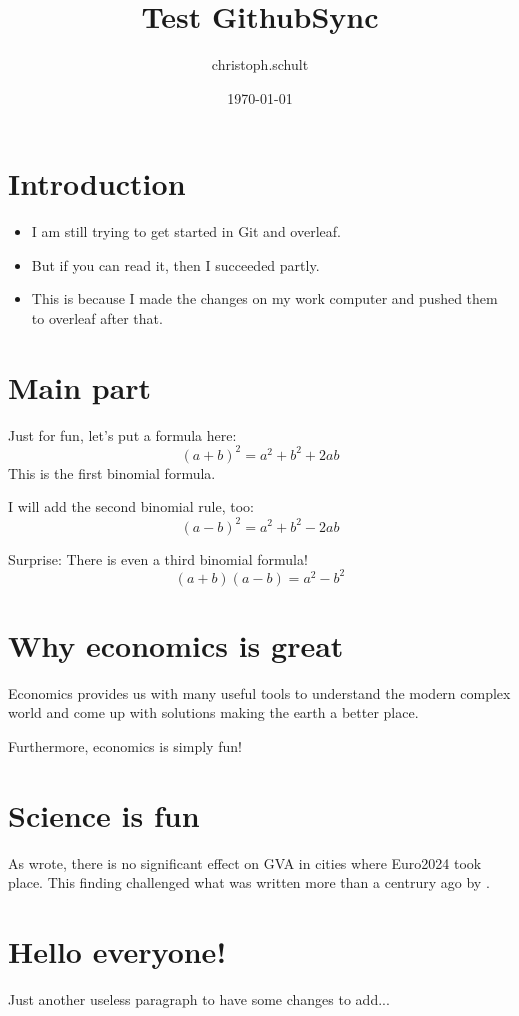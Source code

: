 \documentclass{article}
\title{Test GithubSync}
\author{christoph.schult }
\date{\today}
\begin{document}
\maketitle

\section{Introduction}

\begin{itemize} 
    \item I am still trying to get started in Git and overleaf.
    \item But if you can read it, then I succeeded partly.
    \item This is because I made the changes on my work computer and pushed them to overleaf after that.
\end{itemize}

\section{Main part}
Just for fun, let's put a formula here: 
$$ (a + b)^2 = a^2 + b^2 + 2ab $$
This is the first binomial formula. 

I will add the second binomial rule, too:
$$ (a - b)^2 = a^2 + b^2 - 2ab $$

Surprise: There is even a third binomial formula!
$$ (a + b)(a - b) = a^2 - b^2 $$

\section{Why economics is great}
Economics provides us with many useful tools to understand the modern 
complex world and come up with solutions making the earth a better place.

Furthermore, economics is simply fun!

\section{Science is fun}
As \cite{holtem2024a} wrote, there is no significant effect on GVA in cities where Euro2024 took place. This finding challenged what was written more than a centrury ago by \cite{einstein1905}.

\section{Hello everyone!}
Just another useless paragraph to have some changes to add...
\end{document}
